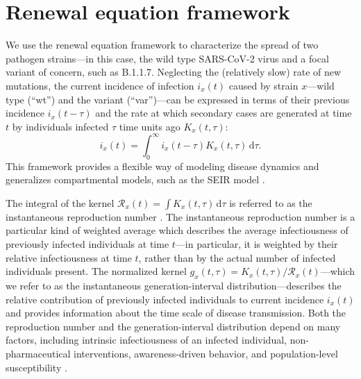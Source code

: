 \documentclass[12pt]{article}
\newcommand{\RR}{\ensuremath{{\mathcal R}}\xspace}
\newcommand{\dd}[1]{\ensuremath{\, \mathrm{d}#1}}
\newcommand{\dtau}{\dd{\tau}}
\begin{document}
\section{Renewal equation framework}

We use the renewal equation framework to characterize the spread of two pathogen strains---in this case, the wild type SARS-CoV-2 virus and a focal variant of concern, such as B.1.1.7.
Neglecting the (relatively slow) rate of new mutations, the current incidence of infection $i_x(t)$ caused by strain $x$---wild type (``wt'') and the variant (``var'')---can be expressed in terms of their previous incidence $i_x(t-\tau)$ and the rate at which secondary cases are generated at time $t$ by individuals infected $\tau$ time units ago $K_x(t, \tau)$:
\begin{equation}
i_x(t) = \int_0^\infty i_x(t-\tau) K_x(t, \tau) \dtau.
\end{equation}
This framework provides a flexible way of modeling disease dynamics and generalizes compartmental models, such as the SEIR model \citep{heesterbeek1996concept, diekmann2000mathematical, roberts2004modelling, aldis2005integral, roberts2007model, champredon2018equivalence}.

The integral of the kernel $\RR_x(t) = \int K_x(t, \tau) \dtau$ is referred to as the instantaneous reproduction number \citep{fraser2007estimating}.
The instantaneous reproduction number is a particular kind of weighted average which describes the average infectiousness of previously infected individuals at time $t$---in particular, it is weighted by their relative infectiousness at time $t$, rather than by the actual number of infected individuals present.
The normalized kernel $g_x(t, \tau) = K_x(t, \tau)/\RR_x(t)$---which we refer to as the instantaneous generation-interval distribution---describes the relative contribution of previously infected individuals to current incidence $i_x(t)$ and provides information about the time scale of disease transmission.
Both the reproduction number and the generation-interval distribution depend on many factors, including intrinsic infectiousness of an infected individual, non-pharmaceutical interventions, awareness-driven behavior, and population-level susceptibility \citep{fraser2007estimating}.
\end{document}
